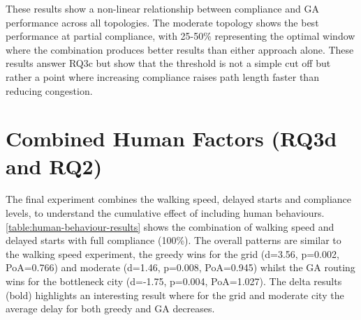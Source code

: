 \documentclass[12pt,a4paper]{report}
\begin{document}
These results show a non-linear relationship between compliance and GA performance across all topologies. The moderate topology shows the best performance at partial compliance, with 25-50\% representing the optimal window where the combination produces better results than either approach alone. These results answer RQ3c but show that the threshold is not a simple cut off but rather a point where increasing compliance raises path length faster than reducing congestion.

\section{Combined Human Factors (RQ3d and RQ2)}
The final experiment combines the walking speed, delayed starts and compliance levels, to understand the cumulative effect of including human behaviours. \autoref{table:human-behaviour-results} shows the combination of walking speed and delayed starts with full compliance (100\%). The overall patterns are similar to the walking speed experiment, the greedy wins for the grid (d=3.56, p=0.002, PoA=0.766) and moderate (d=1.46, p=0.008, PoA=0.945) whilst the GA routing wins for the bottleneck city (d=-1.75, p=0.004, PoA=1.027). The delta results (bold) highlights an interesting result where for the grid and moderate city the average delay for both greedy and GA decreases.
\end{document}
